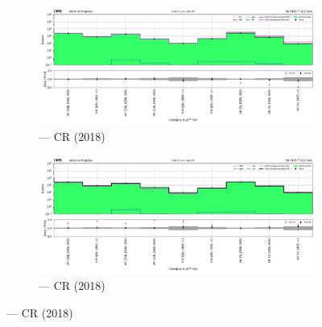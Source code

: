 \begin{figure}[htbp]
    \centering
    \begin{subfigure}[b]{0.49\textwidth}
        \includegraphics[width=\textwidth]{chapters/higgstoinv/figures/mountain_ranges/2018/VH/Wmunu_tree_fit_s-abs_values_VH_cats.pdf}
        \caption{\VH --- \singleMuCr \gls{CR} (2018)}
    \end{subfigure}
    \hfill
    \begin{subfigure}[b]{0.49\textwidth}
        \includegraphics[width=\textwidth]{chapters/higgstoinv/figures/mountain_ranges/2018/VH/Wenu_tree_fit_s-abs_values_VH_cats.pdf}
        \caption{\VH --- \singleEleCr \gls{CR} (2018)}
    \end{subfigure}


\end{figure}
